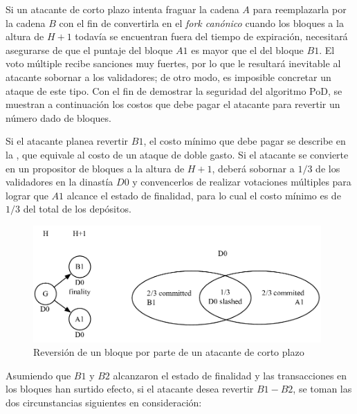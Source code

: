 Si un atacante de corto plazo intenta fraguar la cadena $A$ para reemplazarla por la cadena $B$ con el fin de convertirla en el \textit{fork canónico} cuando los bloques a la altura de $H+1$ todavía se encuentran fuera del tiempo de expiración, necesitará asegurarse de que el puntaje del bloque $A1$ es mayor que el del bloque $B1$. El voto múltiple recibe sanciones muy fuertes, por lo que le resultará inevitable al atacante sobornar a los validadores; de otro modo, es imposible concretar un ataque de este tipo. Con el fin de demostrar la seguridad del algoritmo PoD, se muestran a continuación los costos que debe pagar el atacante para revertir un número dado de bloques.

Si el atacante planea revertir $B1$, el costo mínimo que debe pagar se describe en la  , que equivale al costo de un ataque de doble gasto. Si el atacante se convierte en un propositor de bloques a la altura de $H+1$, deberá sobornar a $1/3$ de los validadores en la dinastía $D0$ y convencerlos de realizar votaciones múltiples para lograr que $A1$ alcance el estado de finalidad, para lo cual el costo mínimo es de $1/3$ del total de los depósitos.

\begin{figure}[h]
\centering
\includegraphics[width=11cm]{./figs/revert1}
\caption{Reversión de un bloque por parte de un atacante de corto plazo}
\label{fig:revert1}
\end{figure}

Asumiendo que $B1$ y $B2$ alcanzaron el estado de finalidad y las transacciones en los bloques han surtido efecto, si el atacante desea revertir $B1-B2$, se toman las dos circunstancias siguientes en consideración:

